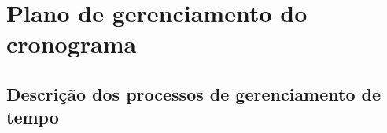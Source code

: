 
\chapter{Plano de gerenciamento do cronograma}

\section{Descrição dos processos de gerenciamento de tempo}

